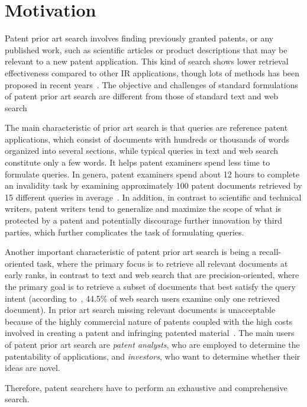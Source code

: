 \section{Motivation}
\label{sec:Motivation}
Patent prior art search involves finding previously granted patents,
or any published work, such as scientific articles or product
descriptions that may be relevant to a new patent application. 
This kind of search shows lower retrieval effectiveness compared to other IR applications, 
though lots of methods has been proposed in recent years~\citep{lupu2013patent}. 
The objective and challenges of standard formulations of patent prior art
search are different from those of standard text and web search~\citep{magdy2012toward}

The main characteristic of prior art search is that queries are reference patent
applications, which consist of documents with hundreds or thousands of
words organized into several sections, while typical queries in text
and web search constitute only a few words. It helps patent examiners spend less time to  
formulate queries. In genera, patent
examiners spend about 12 hours to complete an invalidity task by examining
approximately 100 patent documents retrieved by 15 different queries in average~\citep{joho2010survey}.
In addition, in contrast to scientific and technical writers, patent writers
tend to generalize and maximize the scope of what is protected by a
patent and potentially discourage further innovation by third parties,
which further complicates the task of formulating queries. 

Another important characteristic of patent prior art
search is being a recall-oriented task, where the primary focus is to
retrieve all relevant documents at early ranks, in contrast to text
and web search that are precision-oriented, where the primary goal is
to retrieve a subset of documents that best satisfy the query
intent (according to~\citep{zhang2010search}, 44.5\% of web search users examine only one retrieved document). 
In prior art search missing relevant documents is unacceptable because of the highly commercial nature of patents coupled with the high costs involved
in creating a patent and infringing patented material~\citep{joho2010survey}. The main users of patent prior art search are 
\textit{patent analysts}, who are employed to determine the patentability of applications, and \textit{investors}, who want to determine whether their ideas are novel.


Therefore, patent searchers have to perform an exhaustive and comprehensive
search.

